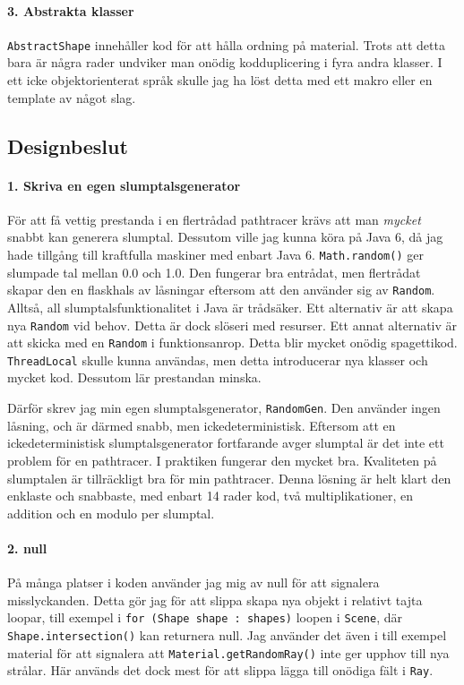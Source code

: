 \documentclass{article}
\begin{document}
\paragraph{3. Abstrakta klasser}
\texttt{AbstractShape} innehåller kod för att hålla ordning på
material. Trots att detta bara är några rader undviker man onödig
kodduplicering i fyra andra klasser. I ett icke objektorienterat språk
skulle jag ha löst detta med ett makro eller en template av något
slag.


\subsection{Designbeslut}
\paragraph{1. Skriva en egen slumptalsgenerator}
För att få vettig prestanda i en flertrådad pathtracer krävs att man
\emph{mycket} snabbt kan generera slumptal. Dessutom ville jag kunna
köra på Java 6, då jag hade tillgång till kraftfulla maskiner med
enbart Java 6. \texttt{Math.random()} ger slumpade tal mellan 0.0 och
1.0. Den fungerar bra entrådat, men flertrådat skapar den en flaskhals
av låsningar eftersom att den använder sig av \texttt{Random}. Alltså,
all slumptalsfunktionalitet i Java är trådsäker. Ett alternativ är att
skapa nya \texttt{Random} vid behov. Detta är dock slöseri med
resurser. Ett annat alternativ är att skicka med en \texttt{Random} i
funktionsanrop. Detta blir mycket onödig
spagettikod. \texttt{ThreadLocal} skulle kunna användas, men detta
introducerar nya klasser och mycket kod. Dessutom lär prestandan
minska.

Därför skrev jag min egen slumptalsgenerator, \texttt{RandomGen}. Den
använder ingen låsning, och är därmed snabb, men
ickedeterministisk. Eftersom att en ickedeterministisk
slumptalsgenerator fortfarande avger slumptal är det inte ett problem
för en pathtracer. I praktiken fungerar den mycket bra. Kvaliteten på
slumptalen är tillräckligt bra för min pathtracer. Denna lösning är
helt klart den enklaste och snabbaste, med enbart 14 rader kod, två
multiplikationer, en addition och en modulo per slumptal.

\paragraph{2. null}
På många platser i koden använder jag mig av null för att signalera
misslyckanden. Detta gör jag för att slippa skapa nya objekt i
relativt tajta loopar, till exempel i \texttt{for (Shape shape :
  shapes)} loopen i \texttt{Scene}, där \texttt{Shape.intersection()}
kan returnera null. Jag använder det även i till exempel material för
att signalera att \texttt{Material.getRandomRay()} inte ger upphov
till nya strålar. Här används det dock mest för att slippa lägga till
onödiga fält i \texttt{Ray}.
\end{document}
